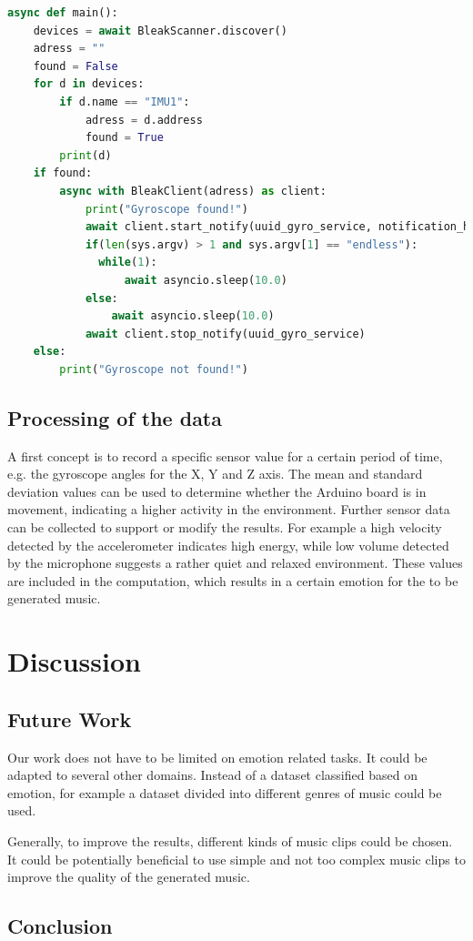 \documentclass{article}
\begin{document}
\begin{lstlisting}[language=Python, frame=single, breaklines=true]
async def main():
    devices = await BleakScanner.discover()
    adress = ""
    found = False
    for d in devices:
        if d.name == "IMU1":
            adress = d.address
            found = True
        print(d)
    if found:
        async with BleakClient(adress) as client:
            print("Gyroscope found!")
            await client.start_notify(uuid_gyro_service, notification_handler)
            if(len(sys.argv) > 1 and sys.argv[1] == "endless"):
              while(1):
                  await asyncio.sleep(10.0)
            else:
                await asyncio.sleep(10.0)
            await client.stop_notify(uuid_gyro_service)
    else:
        print("Gyroscope not found!")    
\end{lstlisting}

\subsection{Processing of the data}
A first concept is to record a specific sensor value for a certain period of time, e.g. the gyroscope angles for the X, Y and Z axis. The mean and standard deviation values can be used to determine whether the Arduino board is in movement, indicating a higher activity in the environment. Further sensor data can be collected to support or modify the results. For example a high velocity detected by the accelerometer indicates high energy, while low volume detected by the microphone suggests a rather quiet and relaxed environment. These values are included in the computation, which results in a certain emotion for the to be generated music.


\section{Discussion}

\subsection{Future Work}
Our work does not have to be limited on emotion related tasks. It could be adapted to several other domains. Instead of a dataset classified based on emotion, for example a dataset divided into different genres of music could be used.

Generally, to improve the results, different kinds of music clips could be chosen. It could be potentially beneficial to use simple and not too complex music clips to improve the quality of the generated music.

\subsection{Conclusion}



 
\end{document}
